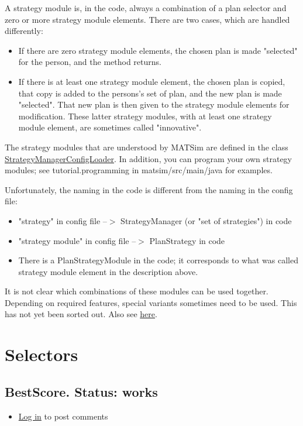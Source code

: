 \documentclass[a4paper,11pt]{report}
\begin{document}
A strategy module is, in the code, always a combination of a plan  selector and zero or more strategy module elements. There are two cases,  which are handled differently:
\begin{itemize}
	\item If there are zero strategy module elements, the chosen plan is made "selected" for the person, and the method returns.
	\item If there is at least one strategy module element, the chosen plan is  copied, that copy is added to the persons's set of plan, and the new  plan is made "selected". That new plan is then given to the  strategy module elements for modification. These latter strategy  modules, with at least one strategy module element, are sometimes called  "innovative".
\end{itemize}

The strategy modules that are understood by MATSim are defined in the class \href{http://www.matsim.org/xref/org/matsim/core/replanning/StrategyManagerConfigLoader.html}{StrategyManagerConfigLoader}. In addition, you can program your own strategy modules; see tutorial.programming in matsim/src/main/java for examples.

Unfortunately, the naming in the code is different from the naming in the config file:
\begin{itemize}
	\item "strategy" in config file --$>$ StrategyManager (or "set of strategies") in code
	\item "strategy module" in config file --$>$ PlanStrategy in code
	\item There is a PlanStrategyModule in the code; it corresponds to what was called strategy module element in the description above.
\end{itemize}

It is not clear which combinations of these modules can be used  together. Depending on required features, special variants sometimes  need to be used. This has not yet been sorted out. Also see \href{http://matsim.org/node/690}{here}.


\vfill\eject
\section{Selectors}

\subsection{BestScore.  Status: works}
\begin{itemize}
	\item \href{http://www.matsim.org/user/login?destination=comment/reply/698%23comment-form}{Log in} to post comments
\end{itemize}
\end{document}
